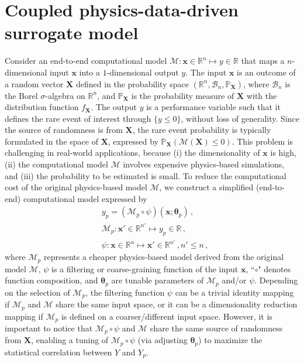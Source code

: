 \documentclass[number,preprint,3p]{elsarticle}
\def\r{\mathbb{R}}
\def\rn{\mathbb{R}^n}
\newcommand{\1}[2]{\mathbb{I}_{#1}\left(#2\right)}
\newcommand{\vect}[1]{\boldsymbol{#1}}
\begin{document}
	\section{Coupled physics-data-driven surrogate model}\label{Sec:surrogatemodel}
	\noindent Consider an end-to-end computational model $\mathcal{M}:\vect x\in\rn\mapsto y\in\r$ that maps a $n$-dimensional input $\vect x$ into a $1$-dimensional output $y$. The input $\vect x$ is an outcome of a random vector $\vect X$ defined in the probability space $(\rn,\mathcal{B}_n,\mathbb{P}_{\vect X})$, where $\mathcal{B}_n$ is the Borel $\sigma$-algebra on $\rn$, and $\mathbb{P}_{\vect X}$ is the probability measure of $\vect X$ with the distribution function $f_{\vect X}$. The output $y$ is a performance variable such that it defines the rare event of interest through $\{y\leq 0\}$, without loss of generality. Since the source of randomness is from $\vect X$, the rare event probability is typically formulated in the space of $\vect X$, expressed by $\mathbb{P}_{\vect X}(\mathcal{M}(\vect X)\leq 0)$. This problem is challenging in real-world applications, because (i) the dimensionality of $\vect x$ is high, (ii) the computational model $\mathcal{M}$ involves expensive physics-based simulations, and (iii) the probability to be estimated is small. 
	To reduce the computational cost of the original physics-based model $\mathcal{M}$, we construct a simplified (end-to-end) computational model expressed by
	\begin{equation}\label{LFmodel}
 \begin{aligned}
     &y_{p}=({\mathcal{M}}_p\circ\psi)(\vect x;\vect\theta_p)\,,\\
     &\mathcal{M}_{p}:\vect x'\in\r^{n'}\mapsto y_p\in\r\,,\\
     & \psi:\vect x\in\rn\mapsto\vect x'\in\r^{n'}\,,n'\leq n\,,
 \end{aligned}		
	\end{equation}
	where $\mathcal{M}_{p}$ represents a cheaper physics-based model derived from the original model $\mathcal{M}$, $\psi$ is a filtering or coarse-graining function of the input $\vect x$, ``$\circ$" denotes function composition, and $\vect\theta_p$ are tunable parameters of $\mathcal{M}_{p}$ and/or $\psi$. Depending on the selection of $\mathcal{M}_{p}$, the filtering function $\psi$ can be a trivial identity mapping if $\mathcal{M}_{p}$ and $\mathcal{M}$ share the same input space, or it can be a dimensionality reduction mapping if $\mathcal{M}_{p}$ is defined on a coarser/different input space. However, it is important to notice that ${\mathcal{M}}_p\circ\psi$ and $\mathcal{M}$ share the same source of randomness from $\vect X$, enabling a tuning of ${\mathcal{M}}_p\circ\psi$ (via adjusting $\vect\theta_p$) to maximize the statistical correlation between $Y$ and $Y_p$. 
\end{document}
